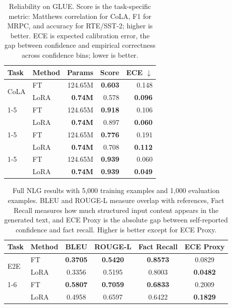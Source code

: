 \documentclass[11pt]{article}
\begin{document}
\begin{table}[h]
\centering
\small
\begin{tabular}{llrrr}
\toprule
Task & Method & Params & Score & ECE $\downarrow$ \\
\midrule
\multirow{2}{*}{CoLA} & FT & 124.65M & \textbf{0.603} & 0.148 \\
 & LoRA & \textbf{0.74M} & 0.578 & \textbf{0.096} \\
\cmidrule(lr){1-5}
\multirow{2}{*}{MRPC} & FT & 124.65M & \textbf{0.918} & 0.106 \\
 & LoRA & \textbf{0.74M} & 0.897 & \textbf{0.060} \\
\cmidrule(lr){1-5}
\multirow{2}{*}{RTE} & FT & 124.65M & \textbf{0.776} & 0.191 \\
 & LoRA & \textbf{0.74M} & 0.708 & \textbf{0.112} \\
\cmidrule(lr){1-5}
\multirow{2}{*}{SST-2} & FT & 124.65M & \textbf{0.939} & 0.060 \\
 & LoRA & \textbf{0.74M} & \textbf{0.939} & \textbf{0.049} \\
\bottomrule
\end{tabular}
\caption{Reliability on GLUE. Score is the task-specific metric: Matthews correlation for CoLA, F1 for MRPC, and accuracy for RTE/SST-2; higher is better. ECE is expected calibration error, the gap between confidence and empirical correctness across confidence bins; lower is better.}
\label{tab:reliability}
\end{table}

\begin{table}[h]
\centering
\small
\begin{tabular}{llcccc}
\toprule
Task & Method & BLEU & ROUGE-L & Fact Recall & ECE Proxy \\
\midrule
\multirow{2}{*}{E2E} & FT & \textbf{0.3705} & \textbf{0.5420} & \textbf{0.8573} & 0.0829 \\
 & LoRA & 0.3356 & 0.5195 & 0.8003 & \textbf{0.0482} \\
\cmidrule(lr){1-6}
\multirow{2}{*}{WebNLG} & FT & \textbf{0.5807} & \textbf{0.7059} & \textbf{0.6833} & 0.2009 \\
 & LoRA & 0.4958 & 0.6597 & 0.6422 & \textbf{0.1829} \\
\bottomrule
\end{tabular}
\caption{Full NLG results with 5,000 training examples and 1,000 evaluation examples. BLEU and ROUGE-L measure overlap with references, Fact Recall measures how much structured input content appears in the generated text, and ECE Proxy is the absolute gap between self-reported confidence and fact recall. Higher is better except for ECE Proxy.}
\label{tab:nlg-full}
\end{table}
\end{document}
